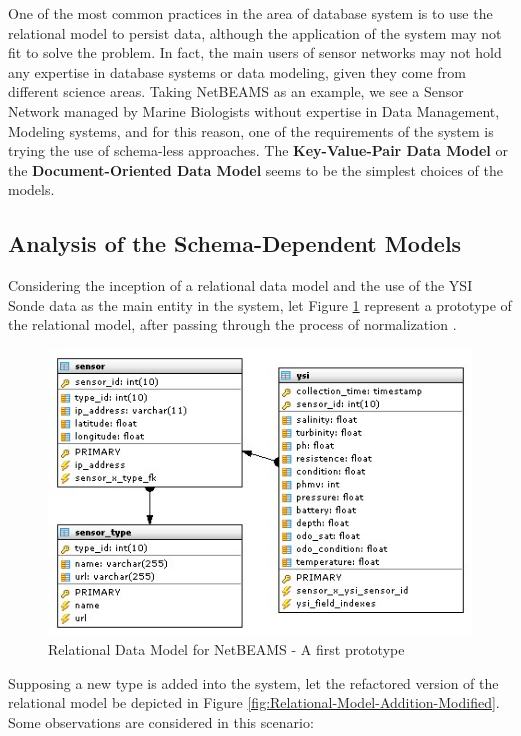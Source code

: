 One of the most common practices in the area of database system is to use the
relational model to persist data, although the application of the system may
not fit to solve the problem. In fact, the main users of sensor networks may
not hold any expertise in database systems or data modeling, given they come
from different science areas. Taking NetBEAMS as an example, we see a Sensor
Network managed by Marine Biologists without expertise in Data Management,
Modeling systems, and for this reason, one of the requirements of the system is
trying the use of schema-less approaches. The \textbf{Key-Value-Pair Data
Model} or the \textbf{Document-Oriented Data Model} seems to be the simplest
choices of the models.

\subsection{Analysis of the Schema-Dependent Models}

Considering the inception of a relational data model \cite{relational-model}
and the use of the YSI Sonde data as the main entity in the system, let Figure
\ref{fig:Relational-Model-Original} represent a prototype of the relational 
model, after passing through the process of normalization
\cite{db-normalization}.

\begin{figure}
  \centering
  \includegraphics[scale=0.5]{../diagrams/Relational-Model-Original}
  \caption{Relational Data Model for NetBEAMS - A first prototype}
  \label{fig:Relational-Model-Original}
\end{figure}

Supposing a new type is added into the system, let the refactored version of
the relational model be depicted in Figure
\ref{fig:Relational-Model-Addition-Modified}. Some observations are
considered in this scenario:

